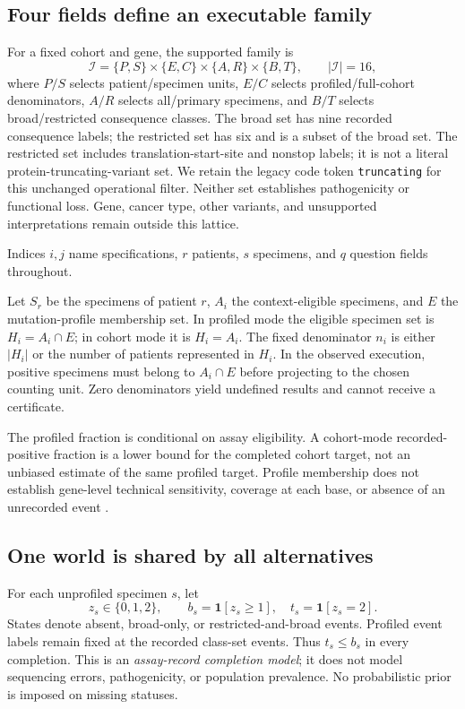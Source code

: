 \subsection{Four fields define an executable family}
For a fixed cohort and gene, the supported family is
\begin{equation}
\mathcal I=\{P,S\}\!\times\!\{E,C\}\!\times\!\{A,R\}\!\times\!\{B,T\},\qquad |\mathcal I|=16,
\label{eq:family}
\end{equation}
where $P/S$ selects patient/specimen units, $E/C$ selects profiled/full-cohort denominators, $A/R$ selects all/primary specimens, and $B/T$ selects broad/restricted consequence classes. The broad set has nine recorded consequence labels; the restricted set has six and is a subset of the broad set. The restricted set includes translation-start-site and nonstop labels; it is not a literal protein-truncating-variant set. We retain the legacy code token \texttt{truncating} for this unchanged operational filter. Neither set establishes pathogenicity or functional loss. Gene, cancer type, other variants, and unsupported interpretations remain outside this lattice.

Indices $i,j$ name specifications, $r$ patients, $s$ specimens, and $q$ question fields throughout.

Let $S_r$ be the specimens of patient $r$, $A_i$ the context-eligible specimens, and $E$ the mutation-profile membership set. In profiled mode the eligible specimen set is $H_i=A_i\cap E$; in cohort mode it is $H_i=A_i$. The fixed denominator $n_i$ is either $|H_i|$ or the number of patients represented in $H_i$. In the observed execution, positive specimens must belong to $A_i\cap E$ before projecting to the chosen counting unit. Zero denominators yield undefined results and cannot receive a certificate.

The profiled fraction is conditional on assay eligibility. A cohort-mode recorded-positive fraction is a lower bound for the completed cohort target, not an unbiased estimate of the same profiled target. Profile membership does not establish gene-level technical sensitivity, coverage at each base, or absence of an unrecorded event \cite{cbio_docs}.

\subsection{One world is shared by all alternatives}
For each unprofiled specimen $s$, let
\begin{equation}
 z_s\in\{0,1,2\},\qquad b_s=\mathbf1[z_s\geq1],\quad t_s=\mathbf1[z_s=2].
\label{eq:latent}
\end{equation}
States denote absent, broad-only, or restricted-and-broad events. Profiled event labels remain fixed at the recorded class-set events. Thus $t_s\leq b_s$ in every completion. This is an \emph{assay-record completion model}; it does not model sequencing errors, pathogenicity, or population prevalence. No probabilistic prior is imposed on missing statuses.

